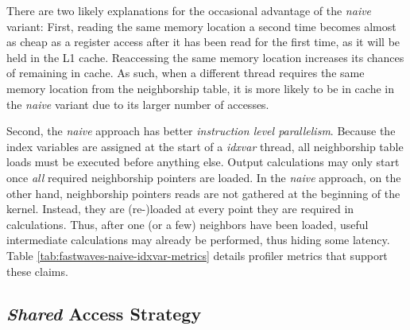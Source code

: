 There are two likely explanations for the occasional advantage of the \emph{naive} variant: First, reading the same memory location a second time becomes almost as cheap as a register access after it has been read for the first time, as it will be held in the L1 cache. Reaccessing the same memory location increases its chances of remaining in cache. As such, when a different thread requires the same memory location from the neighborship table, it is more likely to be in cache in the \emph{naive} variant due to its larger number of accesses.

Second, the \emph{naive} approach has better \emph{instruction level parallelism}. Because the index variables are assigned at the start of a \emph{idxvar} thread, all neighborship table loads must be executed before anything else. Output calculations may only start once \emph{all} required neighborship pointers are loaded. In the \emph{naive} approach, on the other hand, neighborship pointers reads are not gathered at the beginning of the kernel. Instead, they are (re-)loaded at every point they are required in calculations. Thus, after one (or a few) neighbors have been loaded, useful intermediate calculations may already be performed, thus hiding some latency. Table \ref{tab:fastwaves-naive-idxvar-metrics} details profiler metrics that support these claims.


\subsection{\emph{Shared} Access Strategy}

